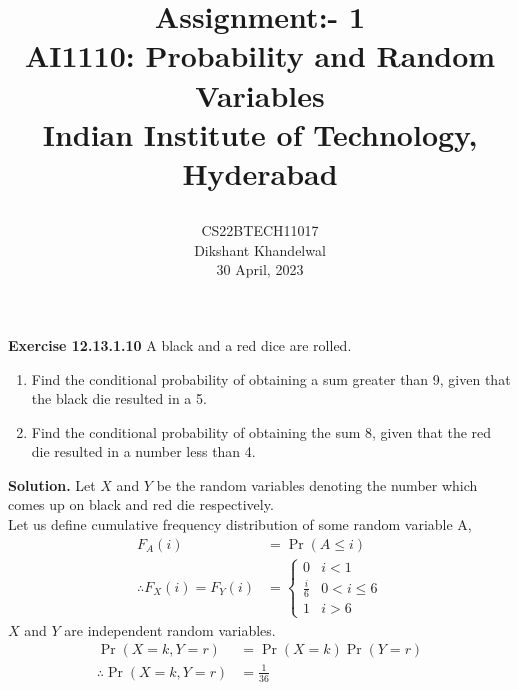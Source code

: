 \documentclass[journal,12pt,twocolumn]{IEEEtran}
\title{

  Assignment:- 1\\
  \Large AI1110: Probability and Random Variables\\
  \Large Indian Institute of Technology, Hyderabad
}
\author{
  CS22BTECH11017\\[4pt]
  Dikshant Khandelwal\\
  30 April, 2023
}
\providecommand{\pr}[1]{\ensuremath{\Pr\left(#1\right)}}
\theoremstyle{remark}
\begin{document}
%

\maketitle

\textbf{Exercise 12.13.1.10} A black and a red dice are rolled.
\begin{enumerate}[label=(\alph*)]
    \item Find the conditional probability of obtaining a sum greater than 9, given
that the black die resulted in a 5.
    \item Find the conditional probability of obtaining the sum 8, given that the red die
resulted in a number less than 4.
\end{enumerate}

\textbf{Solution.} Let $X$ and $Y$ be the random variables denoting the number which comes up on black and red die respectively.\\
Let us define cumulative frequency distribution of some random variable A,
\begin{align}
    F_{A}(i) &= \pr{A \le i}\\
    \therefore  \label{cdf}F_{X}(i) = F_{Y}(i) &= 
              \begin{cases} 0  & i<1\\
                            \frac{i}{6} & 0 < i \le 6\\
                            1 & i> 6
              \end{cases}
\end{align}
$X$ and $Y$ are independent random variables.
\begin{align}
    \pr{X =k , Y =r} &= \pr{X = k} \pr{Y= r}\\
    \therefore \pr{X =k , Y =r} &= \frac{1}{36}
\end{align}
\end{document}
